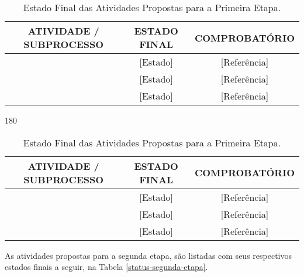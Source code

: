 \begin{sidewaystable}[h]
	\centering
	\ifodd\value{page} %
	\begin{turn}{0}
		\begin{minipage}{\textwidth}
			\centering
			{\renewcommand{\arraystretch}{1.5}
			\scriptsize
			\caption[Estado Final das Atividades Primeira Etapa]{Estado Final das Atividades Propostas para a Primeira Etapa.}
			\label{status-primeira-etapa}
			\begin{tabular}{ccc}
				\hline
				\textbf{ATIVIDADE / SUBPROCESSO} & \textbf{ESTADO FINAL} & \textbf{COMPROBATÓRIO} \\ \hline
				[Atividade 1] & [Estado] & [Referência] \\ \hline
				[Atividade 2] & [Estado] & [Referência] \\ \hline
				[Atividade 3] & [Estado] & [Referência] \\ \hline
				\end{tabular}
			}
		\end{minipage}
	\end{turn}
	\else
	\begin{turn}{180}
		\begin{minipage}{\textwidth}
			\centering
			{\renewcommand{\arraystretch}{1.5}
			\scriptsize
			\caption[Estado Final das Atividades Primeira Etapa]{Estado Final das Atividades Propostas para a Primeira Etapa.}
			\label{status-primeira-etapa}
			\begin{tabular}{ccc}
				\hline
				\textbf{ATIVIDADE / SUBPROCESSO} & \textbf{ESTADO FINAL} & \textbf{COMPROBATÓRIO} \\ \hline
				[Atividade 1] & [Estado] & [Referência] \\ \hline
				[Atividade 2] & [Estado] & [Referência] \\ \hline
				[Atividade 3] & [Estado] & [Referência] \\ \hline
				\end{tabular}
			}
		\end{minipage}
	\end{turn}
	\fi
\end{sidewaystable}

As atividades propostas para a segunda etapa, são listadas com seus respectivos estados finais a seguir, na Tabela \ref{status-segunda-etapa}.

